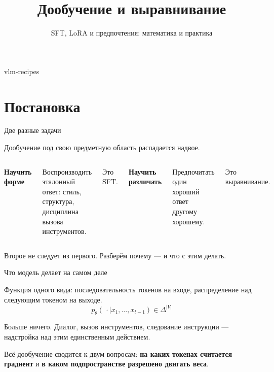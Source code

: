 \documentclass[11pt,aspectratio=169]{beamer}
\title{\bfseries Дообучение и выравнивание}
\subtitle{SFT, LoRA и предпочтения: математика и практика}
\date{}
\newcommand{\key}[1]{%
  \begin{center}\colorbox{boxbg}{\parbox{0.92\textwidth}{\vspace{2pt}#1\vspace{2pt}}}\end{center}}
\newcommand{\aside}[1]{{\color{dim}\small #1}}
\begin{document}
\begin{frame}[plain]
\titlepage
\vspace{-2em}
\aside{vlm-recipes}
\end{frame}

\section{Постановка}

\begin{frame}{Две разные задачи}

Дообучение под свою предметную область распадается надвое.

\vspace{1em}
\begin{columns}[t]
\textbf{\color{acc}Научить форме}

Воспроизводить эталонный ответ: стиль, структура, дисциплина вызова
инструментов.

\vspace{0.5em}
\aside{Это SFT.}

\textbf{\color{acc}Научить различать}

Предпочитать один хороший ответ другому хорошему.

\vspace{0.5em}
\aside{Это выравнивание.}
\end{columns}

\vspace{1.5em}
\key{Второе не следует из первого. Разберём почему — и что с этим делать.}

\end{frame}

\begin{frame}{Что модель делает на самом деле}

Функция одного вида: последовательность токенов на входе, распределение
над следующим токеном на выходе.
\[
p_\theta(\,\cdot \mid x_1,\dots,x_{t-1}) \in \Delta^{|V|}
\]

\vspace{1em}
Больше ничего. Диалог, вызов инструментов, следование инструкции —
надстройка над этим единственным действием.

\vspace{1em}
\key{Всё дообучение сводится к двум вопросам: \textbf{на каких токенах
считается градиент} и \textbf{в каком подпространстве разрешено двигать
веса}.}

\end{frame}
\end{document}
